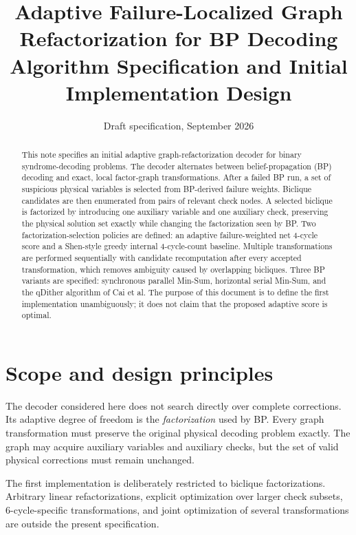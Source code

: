\documentclass[11pt,a4paper]{article}
\title{Adaptive Failure-Localized Graph Refactorization for BP Decoding\\
\large Algorithm Specification and Initial Implementation Design}
\author{}
\date{Draft specification, September 2026}
\begin{document}
\maketitle

\begin{abstract}
This note specifies an initial adaptive graph-refactorization decoder for binary
syndrome-decoding problems. The decoder alternates between belief-propagation
(BP) decoding and exact, local factor-graph transformations. After a failed BP
run, a set of suspicious physical variables is selected from BP-derived failure
weights. Biclique candidates are then enumerated from pairs of relevant check
nodes. A selected biclique is factorized by introducing one auxiliary variable
and one auxiliary check, preserving the physical solution set exactly while
changing the factorization seen by BP. Two factorization-selection policies
are defined: an adaptive failure-weighted net 4-cycle score and a Shen-style
greedy internal 4-cycle-count baseline. Multiple transformations are performed
sequentially with candidate recomputation after every accepted transformation,
which removes ambiguity caused by overlapping bicliques. Three BP variants are
specified: synchronous parallel Min-Sum, horizontal serial Min-Sum, and the
qDither algorithm of Cai et al. The purpose of this document is to define the
first implementation unambiguously; it does not claim that the proposed
adaptive score is optimal.
\end{abstract}

\tableofcontents
\newpage

\section{Scope and design principles}

The decoder considered here does not search directly over complete corrections.
Its adaptive degree of freedom is the \emph{factorization} used by BP. Every
graph transformation must preserve the original physical decoding problem
exactly. The graph may acquire auxiliary variables and auxiliary checks, but
the set of valid physical corrections must remain unchanged.

The first implementation is deliberately restricted to biclique
factorizations. Arbitrary linear refactorizations, explicit optimization over
larger check subsets, 6-cycle-specific transformations, and joint optimization
of several transformations are outside the present specification.
\end{document}
